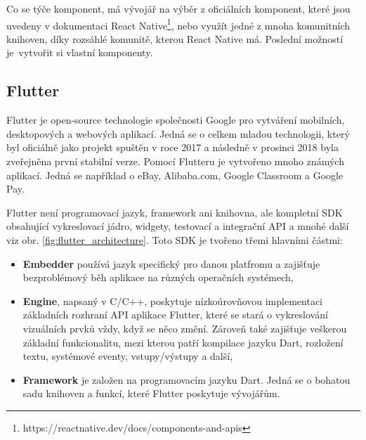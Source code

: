 \documentclass[czech, bc, kiv, he, iso690numb]{fasthesis}
\begin{document}
Co se týče komponent, má vývojář na výběr z oficiálních komponent, které jsou uvedeny v dokumentaci React Native\footnote{https://reactnative.dev/docs/components-and-apis}, nebo využít jedné z mnoha komunitních knihoven, díky rozsáhlé komunitě, kterou React Native má. Poslední možností je~vytvořit si vlastní komponenty. 

\subsection{Flutter} \label{Flutter}

Flutter je open-source technologie společnosti Google pro vytváření mobilních, desktopových a webových aplikací. Jedná se o celkem mladou technologii, který byl oficiálně jako projekt spuštěn v roce 2017 a následně v prosinci 2018 byla zveřejněna první stabilní verze. Pomocí Flutteru je vytvořeno mnoho známých aplikací. Jedná se například o eBay, Alibaba.com, Google Classroom a Google Pay. \cite{Flutter} \cite{Bartosińska_Dembny_2024}

Flutter není programovací jazyk, framework ani knihovna, ale kompletní \gls{SDK} obsahující vykreslovací jádro, widgety, testovací a integrační \gls{API} a mnohé další viz obr. \ref{fig:flutter_architecture}. Toto \gls{SDK} je tvořeno třemi hlavními částmi: \cite{AltexSoft_2022} \cite{Bartosińska_Dembny_2024}

\begin{itemize}
    \item \textbf{Embedder} používá jazyk specifický pro danou platfromu a zajišťuje bezproblémový běh aplikace na různých operačních systémech, 
    \item \textbf{Engine}, napsaný v C/C++, poskytuje nízkoúrovňovou implementaci základních rozhraní \gls{API} aplikace Flutter, které se stará o vykreslování vizuálních prvků vždy, když se něco změní. Zároveň také zajišťuje veškerou základní funkcionalitu, mezi kterou patří kompilace jazyku Dart, rozložení textu, systémové eventy, vstupy/výstupy a další, 
    \item \textbf{Framework} je založen na programovacím jazyku Dart. Jedná se o bohatou sadu knihoven a funkcí, které Flutter poskytuje vývojářům.
\end{itemize}
\end{document}
